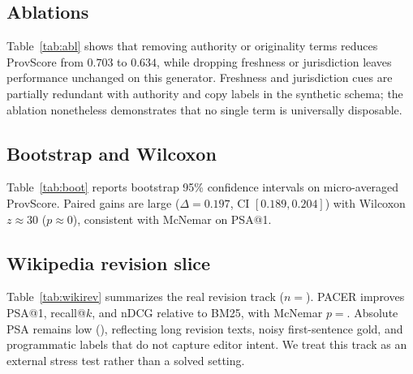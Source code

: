\documentclass[sigconf,anonymous,review]{acmart}
\begin{document}
\begin{table}[t]
  \centering
  \caption{ProvScore stratification: BM25 vs.\ PACER by synthetic family.}
  \label{tab:strat}
\end{table}

\subsection{Ablations}
Table~\ref{tab:abl} shows that removing authority or originality terms reduces ProvScore from $0.703$ to $0.634$, while dropping freshness or jurisdiction leaves performance unchanged on this generator.
Freshness and jurisdiction cues are partially redundant with authority and copy labels in the synthetic schema; the ablation nonetheless demonstrates that no single term is universally disposable.

\begin{table}[t]
  \centering
  \caption{Single-term PACER ablations (synthetic).}
  \label{tab:abl}
\end{table}

\subsection{Bootstrap and Wilcoxon}
Table~\ref{tab:boot} reports bootstrap 95\% confidence intervals on micro-averaged ProvScore.
Paired gains are large ($\Delta{=}0.197$, CI $[0.189, 0.204]$) with Wilcoxon $z{\approx}30$ ($p{\approx}0$), consistent with McNemar on PSA@1.

\begin{table}[t]
  \centering
  \caption{Bootstrap CIs for micro ProvScore; Wilcoxon on paired $\Delta$.}
  \label{tab:boot}
\end{table}

\subsection{Wikipedia revision slice}
Table~\ref{tab:wikirev} summarizes the real revision track ($n{=}$\WikiNumQueries{}).
PACER improves PSA@1, recall@$k$, and nDCG relative to BM25, with McNemar $p{=}$\WikiMcNemarPSA{}.
Absolute PSA remains low (\WikiPacerPSA{}), reflecting long revision texts, noisy first-sentence gold, and programmatic labels that do not capture editor intent.
We treat this track as an external stress test rather than a solved setting.
\end{document}
